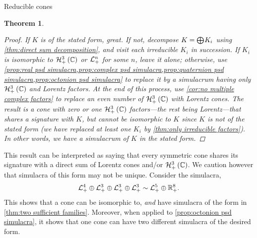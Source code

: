 \documentclass{interact}
\theoremstyle{plain}
\newtheorem{theorem}{Theorem}[section]
\theoremstyle{definition}
\theoremstyle{remark}
\begin{document}
\begin{section}{Reducible cones}
\begin{theorem}
      \begin{proof}
        If $K$ is of the stated form, great. If not, decompose $K =
        \directsummany{}{}{K_{i}}$ using \cref{thm:direct sum
          decomposition}, and visit each irreducible $K_{i}$ in
        succession. If $K_{i}$ is isomorphic to
        $\Hnplus[3]\of{\Cn[1]}$ or $\mathcal{L}^{{n}}_{+}$ for some $n$, leave it
        alone; otherwise, use \cref{prop:real psd
          simulacra,prop:complex psd simulacra,prop:quaternion psd
          simulacra,prop:octonion psd simulacra} to replace it by a
        simulacrum having only $\Hnplus[3]\of{\Cn[1]}$ and Lorentz
        factors. At the end of this process, use \cref{cor:no multiple
          complex factors} to replace an even number of
        $\Hnplus[3]\of{\Cn[1]}$ with Lorentz cones. The result is a
        cone with zero or one $\Hnplus[3]\of{\Cn[1]}$ factors---the
        rest being Lorentz---that shares a signature with $K$, but
        cannot be isomorphic to $K$ since $K$ is not of the stated
        form (we have replaced at least one $K_{i}$ by \cref{thm:only
          irreducible factors}). In other words, we have a simulacrum
        of $K$ in the stated form.
      \end{proof}
    \end{theorem}

    This result can be interpreted as saying that every symmetric cone
    shares its signature with a direct sum of Lorentz cones and/or
    $\Hnplus[3]\of{\Cn[1]}$. We caution however that simulacra of this
    form may not be unique. Consider the simulacra,
    \begin{equation*}
      \Lnplus[4] \oplus \Lnplus[3] \oplus \Lnplus[3] \oplus \Lnplus[3]
      \sim
      \Lnplus[5] \oplus \Rnplus[8].
    \end{equation*}
    This shows that a cone can be isomorphic to, \emph{and} have
    simulacra of the form in \cref{thm:two sufficient
      families}. Moreover, when applied to \cref{prop:octonion psd
      simulacra}, it shows that one cone can have two different
    simulacra of the desired form.


\end{section}
\end{document}
